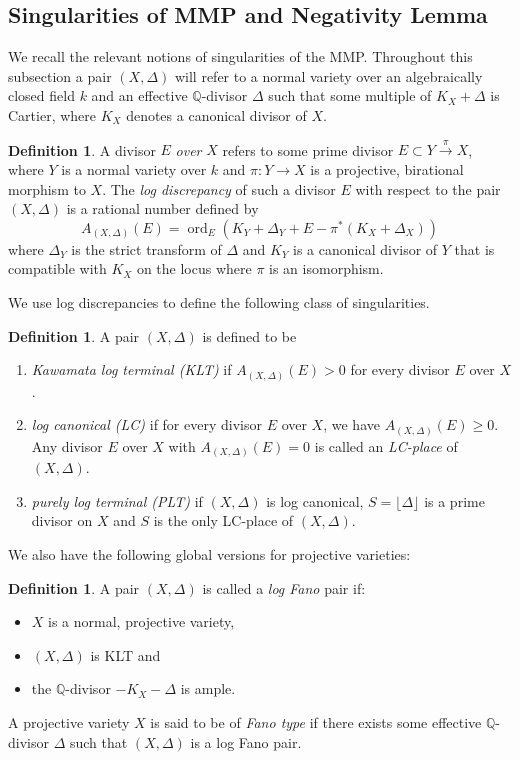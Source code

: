 \documentclass[11pt,reqno]{amsart}
\newcommand{\Q}{\mathbb{Q}}
\DeclareMathOperator{\ord}{ord}
\numberwithin{equation}{section}
\theoremstyle{definition}
\newtheorem{defi}[prop] {Definition}
\begin{document}
\subsection{Singularities of MMP and Negativity Lemma}
We recall the relevant notions of singularities of the MMP. Throughout this subsection a pair $(X, \Delta)$ will refer to a normal variety over an algebraically closed field $k$ and an effective $\Q$-divisor $\Delta $ such that some multiple of $K_X + \Delta$ is Cartier, where $K_X$ denotes a canonical divisor of $X$. 

\begin{defi}
    A divisor $E$ \emph{over} $X$ refers to some prime divisor $E \subset Y \xrightarrow{\pi}  X$, where $Y$ is a normal variety over $k$ and $\pi: Y \to X$ is a projective, birational morphism to $X$. The \emph{log discrepancy} of such a divisor $E$ with respect to the pair $(X, \Delta)$ is a rational number defined by
    \[ A_{(X, \Delta)} (E) = \ord_E (K_Y + \Delta_Y  + E - \pi^* (K_X + \Delta_X) ) \]
    where $\Delta_Y$ is the strict transform of $\Delta$ and $K_Y$ is a canonical divisor of $Y$ that is compatible with $K_X$ on the locus where $\pi$ is an isomorphism.
\end{defi}

We use log discrepancies to define the following class of singularities.

\begin{defi} \label{def:KLT}
    A pair $(X, \Delta)$ is defined to be
    \begin{enumerate}
        \item \emph{Kawamata log terminal (KLT)} if $A_{(X, \Delta)} (E) > 0$ for every divisor $E$ over $X$.

        \item \emph{log canonical (LC)} if for every divisor $E$ over $X$, we have $A_{(X, \Delta)} (E) \geq 0$. Any divisor $E$ over $X$  with $A_{(X, \Delta)} (E) = 0$ is called an \emph{LC-place} of $(X, \Delta)$.

        \item \emph{purely log terminal (PLT)} if $(X, \Delta)$ is log canonical, $S = \lfloor \Delta \rfloor $ is a prime divisor on $X$ and $S$ is the only LC-place of $(X, \Delta)$.
    \end{enumerate}
\end{defi}

We also have the following global versions for projective varieties:

\begin{defi} \label{def:logFano}
    A pair $(X, \Delta)$ is called a \emph{log Fano} pair if:
    \begin{itemize}
        \item $X$ is a normal, projective variety,
        \item $(X, \Delta)$ is KLT and
        \item the $\Q$-divisor $-K_X -\Delta$ is ample.
    \end{itemize}
    A projective variety $X$ is said to be of \emph{Fano type} if there exists some effective $\Q$-divisor $\Delta$ such that $(X, \Delta)$ is a log Fano pair.
\end{defi}
\end{document}
